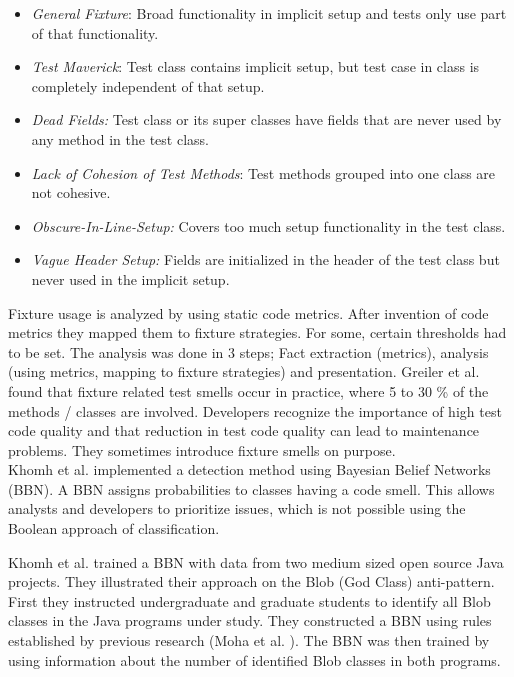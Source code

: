 \documentclass{uvamscse}
\newcommand{\Afixture}{Greiler et al.}
\begin{document}
\begin{itemize}
	\item \textit{General Fixture}: Broad functionality in implicit setup and tests only use part of that functionality.
	\item\textit{ Test Maverick}: Test class contains implicit setup, but test case in class is completely independent of that setup.
	\item \textit{Dead Fields:} Test class or its super classes have fields that are never used by any method in the test class.
	\item \textit{Lack of Cohesion of Test Methods}: Test methods grouped into one class are not cohesive.
	\item \textit{Obscure-In-Line-Setup:} Covers too much setup functionality in the test class.
	\item \textit{Vague Header Setup:} Fields are initialized in the header of the test class but never used in the implicit setup.
\end{itemize}

Fixture usage is analyzed by using static code metrics. After invention of code metrics they mapped them to fixture strategies. For some, certain thresholds had to be set. The analysis was done in 3 steps; Fact extraction (metrics), analysis (using metrics, mapping to fixture strategies) and presentation. \Afixture{} found that fixture related test smells occur in practice, where 5 to 30 \% of the methods / classes are involved. Developers recognize the importance of high test code quality and that reduction in test code quality can lead to maintenance problems. They sometimes introduce fixture smells on purpose. \\

Khomh et al. implemented a detection method using Bayesian Belief Networks (BBN)\cite{khomh2009bayesian}. A BBN assigns probabilities to classes having a code smell. This allows analysts and developers to prioritize issues, which is not possible using the Boolean approach of classification. 

Khomh et al. trained a BBN with data from two medium sized open source Java projects. They illustrated their approach on the Blob (God Class) anti-pattern. First they instructed undergraduate and graduate students to identify all Blob classes in the Java programs under study. They constructed a BBN using rules established by previous research (Moha et al. \cite{moha2010domain}). The BBN was then trained by using information about the number of identified Blob classes in both programs. 
\end{document}
